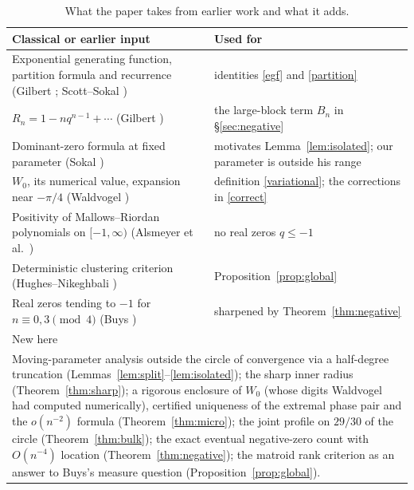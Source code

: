 \documentclass[11pt,a4paper]{article}
\theoremstyle{remark}
\begin{document}
\begin{table}[ht]
\centering\small
\begin{tabular}{p{}p{}}\toprule
Classical or earlier input & Used for\\\midrule
Exponential generating function, partition formula and recurrence (Gilbert \cite{Gilbert}; Scott--Sokal \cite{SS}) & identities \eqref{egf} and \eqref{partition}\\
$R_n=1-nq^{n-1}+\cdots$ (Gilbert \cite{Gilbert}) & the large-block term $B_n$ in \S\ref{sec:negative}\\
Dominant-zero formula at fixed parameter (Sokal \cite{Sokal}) & motivates Lemma~\ref{lem:isolated}; our parameter is outside his range\\
$W_0$, its numerical value, expansion near $-\pi/4$ (Waldvogel \cite{Wald}) & definition \eqref{variational}; the corrections in \eqref{correct}\\
Positivity of Mallows--Riordan polynomials on $[-1,\infty)$ (Alsmeyer et al.\ \cite{ABRS}) & no real zeros $q\le-1$\\
Deterministic clustering criterion (Hughes--Nikeghbali \cite{HN}) & Proposition~\ref{prop:global}\\
Real zeros tending to $-1$ for $n\equiv0,3\pmod4$ (Buys \cite{Buys}) & sharpened by Theorem~\ref{thm:negative}\\\midrule
New here & \\\midrule
\multicolumn{2}{p{0.92\textwidth}}{Moving-parameter analysis outside the circle of convergence via a half-degree truncation (Lemmas~\ref{lem:split}--\ref{lem:isolated}); the sharp inner radius (Theorem~\ref{thm:sharp}); a rigorous enclosure of $W_0$ (whose digits Waldvogel had computed numerically), certified uniqueness of the extremal phase pair and the $o(n^{-2})$ formula (Theorem~\ref{thm:micro}); the joint profile on $29/30$ of the circle (Theorem~\ref{thm:bulk}); the exact eventual negative-zero count with $O(n^{-4})$ location (Theorem~\ref{thm:negative}); the matroid rank criterion as an answer to Buys's measure question (Proposition~\ref{prop:global}).}\\\bottomrule
\end{tabular}
\caption{What the paper takes from earlier work and what it adds.}\label{tab:ledger}
\end{table}
\end{document}
